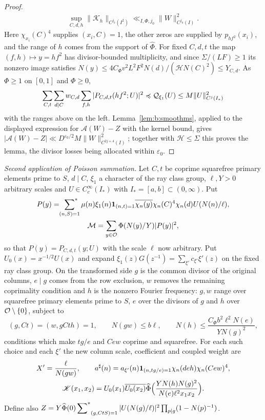 \begin{proof}
\[\begin{gathered}
  \sup_{C,d,h}\|\mathscr K_h\|_{C^{j_0}(I^2)}\ll_{I,\Phi,j_0}\|W\|^2_{C^{j_0}(I)}.
  \end{gathered}
\]
Here $\chi_{x_i}(C)^4$ supplies $(x_i,C)=1$, the other zeros are supplied by $p_{hf^2}(x_i)$, and the range of $h$ comes from the support of $\widehat\Phi$. For fixed $C,d,t$ the map $(f,h)\mapsto y=hf^2$ has divisor-bounded multiplicity, and since $\Sigma/(LF)\ge1$ its nonzero image satisfies $N(y)\le4C_\Phi v^2L^2F^2N(d)/(\mathcal HN(C)^2)\le Y_{C,d}$. As $\Phi\ge1$ on $[0,1]$ and $\Phi\ge0$,
\[
  \sum_{C,t}\sum_{d\mid C}w_{C,d}\sum_{f,h}|P_{C,d,t}(hf^2;U)|^2\preccurlyeq\mathcal Q_{\xi_1}(U)\le M\|U\|^2_{C^j(I_*)}
\]
with the ranges above on the left. Lemma~\ref{lem:b:smoothms}, applied to the displayed expression for $\mathcal A(W)-Z$ with the kernel bound, gives $|\mathcal A(W)-Z|\ll D^{\varepsilon_0/2}M\|W\|^2_{C^{2j+4}(I)}$; together with $\mathcal H\le\Sigma$ this proves the lemma, the divisor losses being allocated within $\varepsilon_0$.
\end{proof}

\emph{Second application of Poisson summation.} Let $C,t$ be coprime squarefree primary elements prime to $S$, $d\mid C$, $\xi_1$ a character of the ray class group, $\ell,Y>0$ arbitrary scales and $U\in C_c^\infty(I_*)$ with $I_*=[a,b]\subset(0,\infty)$. Put
\begin{equation}\label{eq:b:commonmobius}
  \begin{gathered}
  P(y)=\sideset{}{^*}\sum_{(n,S)=1}\mu(n)\xi_1(n)\mathbf{1}_{(n,t)=1}\overline{\chi_n(y)}\chi_n(C)^4\chi_n(d)U(N(n)/\ell),\\
  \mathcal M=\sum_{y\in\mathcal{O}}\Phi(N(y)/Y)|P(y)|^2,
  \end{gathered}
\end{equation}
so that $P(y)=P_{C,d,t}(y;U)$ with the scale $\ell$ now arbitrary. Put $U_0(x)=x^{-1/2}U(x)$ and expand $\xi_1(z)G(z^{-1})=\sum_{\xi'}c_{\xi'}\xi'(z)$ on the fixed ray class group. On the transformed side $g$ is the common divisor of the original columns, $e\mid g$ comes from the row exclusion, $w$ removes the remaining coprimality condition and $h$ is the nonzero Fourier frequency: $g,w$ range over squarefree primary elements prime to $S$, $e$ over the divisors of $g$ and $h$ over $\mathcal{O}\setminus\{0\}$, subject to
\[
  (g,Ct)=(w,gCth)=1,\qquad N(gw)\le b\ell,\qquad N(h)\le\frac{C_\Phi b^2\ell^2N(e)}{YN(g)^2},
\]
conditions which make $tg/e$ and $Cew$ coprime and squarefree. For each such choice and each $\xi'$ the new column scale, coefficient and coupled weight are
\begin{equation}\label{eq:b:commonpoissonoutput}
  \begin{gathered}
  X'=\frac\ell{N(gw)},\qquad a^\sharp(n)=a_{\xi'}(n)\mathbf{1}_{(n,tg/e)=1}\chi_n(deh)\chi_n(Cew)^4,\\
  \mathscr K(x_1,x_2)=U_0(x_1)\overline{U_0(x_2)}\widehat\Phi\Bigl(\frac{YN(h)N(g)^2}{N(e)\ell^2x_1x_2}\Bigr).
  \end{gathered}
\end{equation}
Define also $Z=Y\widehat\Phi(0)\sideset{}{^*}\sum_{(g,CtS)=1}|U(N(g)/\ell)|^2\prod_{p\mid g}(1-N(p)^{-1})$.


